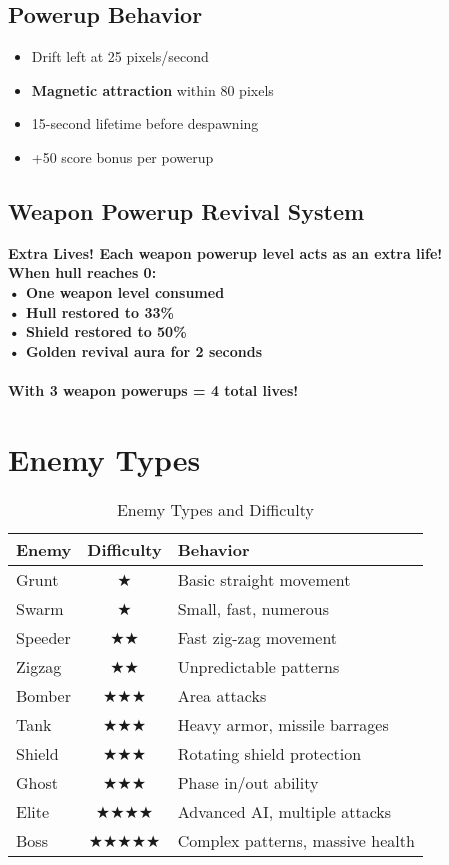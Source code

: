 \documentclass[11pt,a4paper]{article}
\newcommand{\infobox}[2]{%
    \vspace{0.3cm}
    \noindent\colorbox{#1!10}{%
        \parbox{\dimexpr\textwidth-2\fboxsep}{%
            \textcolor{#1}{\textbf{#2}}
        }
    }
    \vspace{0.3cm}
}
\begin{document}
\subsection{Powerup Behavior}
\begin{itemize}
    \item Drift left at 25 pixels/second
    \item \textbf{Magnetic attraction} within 80 pixels
    \item 15-second lifetime before despawning
    \item +50 score bonus per powerup
\end{itemize}

\subsection{Weapon Powerup Revival System}

\infobox{successcolor}{\textbf{Extra Lives!} Each weapon powerup level acts as an extra life!\\
When hull reaches 0:\\
• One weapon level consumed\\
• Hull restored to 33\%\\
• Shield restored to 50\%\\
• Golden revival aura for 2 seconds\\
\\
With 3 weapon powerups = \textbf{4 total lives!}}

\section{Enemy Types}

\begin{table}[h]
\centering
\footnotesize
\begin{tabularx}{\textwidth}{|l|c|X|}
\hline
\rowcolor{primarycolor!20}
\textbf{Enemy} & \textbf{Difficulty} & \textbf{Behavior} \\
\hline
Grunt & ★ & Basic straight movement \\
\hline
Swarm & ★ & Small, fast, numerous \\
\hline
Speeder & ★★ & Fast zig-zag movement \\
\hline
Zigzag & ★★ & Unpredictable patterns \\
\hline
Bomber & ★★★ & Area attacks \\
\hline
Tank & ★★★ & Heavy armor, missile barrages \\
\hline
Shield & ★★★ & Rotating shield protection \\
\hline
Ghost & ★★★ & Phase in/out ability \\
\hline
Elite & ★★★★ & Advanced AI, multiple attacks \\
\hline
Boss & ★★★★★ & Complex patterns, massive health \\
\hline
\end{tabularx}
\caption{Enemy Types and Difficulty}
\end{table}
\end{document}
